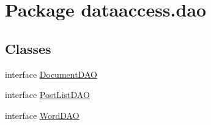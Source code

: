 \hypertarget{namespacedataaccess_1_1dao}{\section{\-Package dataaccess.\-dao}
\label{namespacedataaccess_1_1dao}
}
\subsection*{\-Classes}
\begin{DoxyCompactItemize}
\item 
interface \hyperlink{interfacedataaccess_1_1dao_1_1_document_d_a_o}{\-Document\-D\-A\-O}
\item 
interface \hyperlink{interfacedataaccess_1_1dao_1_1_post_list_d_a_o}{\-Post\-List\-D\-A\-O}
\item 
interface \hyperlink{interfacedataaccess_1_1dao_1_1_word_d_a_o}{\-Word\-D\-A\-O}
\end{DoxyCompactItemize}
